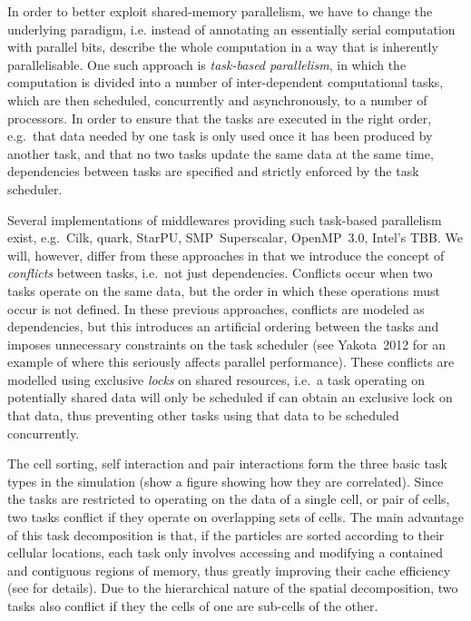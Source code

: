 \documentclass[final]{siamltex}
\begin{document}
In order to better exploit shared-memory parallelism, 
we have to change the underlying paradigm, i.e. instead
of annotating an essentially serial computation with parallel
bits, describe the whole computation in a way that
is inherently parallelisable.
One such approach is {\em task-based parallelism}, in which the
computation is divided into a number of inter-dependent
computational tasks, which are then scheduled, concurrently
and asynchronously, to a number of processors.
In order to ensure that the tasks are executed in the right
order, e.g.~that data needed by one task is only used once it
has been produced by another task, and that no two tasks
update the same data at the same time, dependencies between
tasks are specified and strictly enforced by the task
scheduler.

Several implementations of middlewares providing such task-based
parallelism exist, e.g.~Cilk, {\sc quark},
StarPU, SMP~Superscalar, OpenMP~3.0, Intel's TBB.
We will, however, differ from these approaches in that we introduce the
concept of {\em conflicts} between tasks, i.e.~not just dependencies.
Conflicts occur when two tasks operate on the same data, 
but the order in which these operations must occur is not defined.
In these previous approaches, conflicts are modeled as dependencies,
but this introduces an artificial ordering between the tasks
and imposes unnecessary constraints on the task scheduler
(see Yakota~2012 for an example of where this seriously
affects parallel performance).
These conflicts are modelled using exclusive {\em locks} on shared
resources, i.e.~a task operating on potentially shared data will
only be scheduled if can obtain an exclusive lock on that data,
thus preventing other tasks using that data to be scheduled concurrently.

The cell sorting, self interaction and pair interactions form
the three basic task types in the simulation (show a figure
showing how they are correlated).
Since the tasks are restricted to operating on the data of a
single cell, or pair of cells, two tasks conflict if they
operate on overlapping sets of cells.
The main advantage of this task decomposition is that, if
the particles are sorted according to their cellular locations,
each task only involves accessing and modifying a contained
and contiguous regions of memory, thus greatly improving their
cache efficiency (see \cite{ref:Gonnet2012} for details).
Due to the hierarchical nature of the spatial decomposition,
two tasks also conflict if they the cells of one are sub-cells
of the other.
\end{document}
